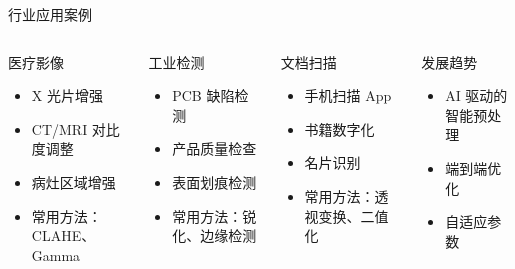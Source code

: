 \begin{frame}{行业应用案例}
    \begin{columns}
        \begin{block}{医疗影像}
            \begin{itemize}
                \item X 光片增强
                \item CT/MRI 对比度调整
                \item 病灶区域增强
                \item 常用方法：CLAHE、Gamma
            \end{itemize}
        \end{block}

        \begin{block}{工业检测}
            \begin{itemize}
                \item PCB 缺陷检测
                \item 产品质量检查
                \item 表面划痕检测
                \item 常用方法：锐化、边缘检测
            \end{itemize}
        \end{block}

        \begin{block}{文档扫描}
            \begin{itemize}
                \item 手机扫描 App
                \item 书籍数字化
                \item 名片识别
                \item 常用方法：透视变换、二值化
            \end{itemize}
        \end{block}

        \begin{alertblock}{发展趋势}
            \begin{itemize}
                \item AI 驱动的智能预处理
                \item 端到端优化
                \item 自适应参数
            \end{itemize}
        \end{alertblock}
    \end{columns}
\end{frame}
